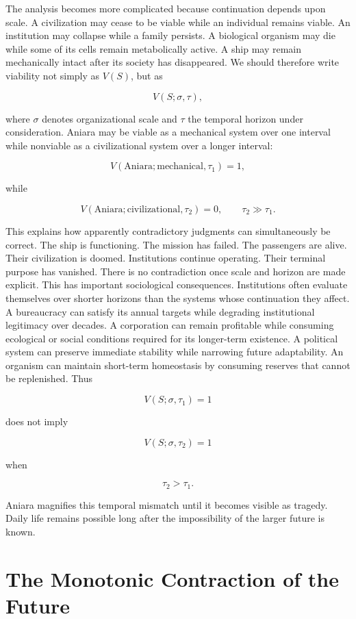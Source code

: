 \documentclass[11pt,oneside]{book}
\theoremstyle{definition}
\theoremstyle{remark}
\begin{document}
The analysis becomes more complicated because continuation depends upon scale. A civilization may
cease to be viable while an individual remains viable. An institution may collapse while a family
persists. A biological organism may die while some of its cells remain metabolically active. A ship
may remain mechanically intact after its society has disappeared. We should therefore write
viability not simply as \(V(S)\), but as

\[
V(S;\sigma,\tau),
\]

where \(\sigma\) denotes organizational scale and \(\tau\) the temporal horizon under consideration.
Aniara may be viable as a mechanical system over one interval while nonviable as a civilizational
system over a longer interval:

\[
V(\text{Aniara};\text{mechanical},\tau_1)=1,
\]

while

\[
V(\text{Aniara};\text{civilizational},\tau_2)=0, \qquad \tau_2\gg\tau_1.
\]

This explains how apparently contradictory judgments can simultaneously be correct. The ship is
functioning. The mission has failed. The passengers are alive. Their civilization is doomed.
Institutions continue operating. Their terminal purpose has vanished. There is no contradiction once
scale and horizon are made explicit. This has important sociological consequences. Institutions
often evaluate themselves over shorter horizons than the systems whose continuation they affect. A
bureaucracy can satisfy its annual targets while degrading institutional legitimacy over decades. A
corporation can remain profitable while consuming ecological or social conditions required for its
longer-term existence. A political system can preserve immediate stability while narrowing future
adaptability. An organism can maintain short-term homeostasis by consuming reserves that cannot be
replenished. Thus

\[
V(S;\sigma,\tau_1)=1
\]

does not imply

\[
V(S;\sigma,\tau_2)=1
\]

when

\[
\tau_2>\tau_1.
\]

Aniara magnifies this temporal mismatch until it becomes visible as tragedy. Daily life remains
possible long after the impossibility of the larger future is known.

\section{The Monotonic Contraction of the Future}
\end{document}
